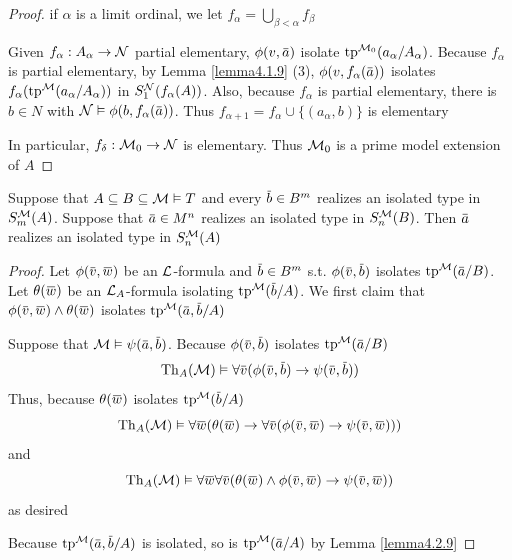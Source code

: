 \documentclass[11pt]{article}
\begin{document}
\begin{proof}
if \(\alpha\) is a limit ordinal, we let \(f_\alpha=\bigcup_{\beta<\alpha}f_\beta\)

Given \(f_\alpha:A_\alpha\to\mathcal{N}\) partial elementary, \(\phi(v,\bara)\) isolate \(\operatorname{tp}^{\mathcal{M}_0}(a_\alpha/A_\alpha)\).
Because \(f_\alpha\) is partial elementary, by Lemma \ref{lemma4.1.9} (3), \(\phi(v,f_\alpha(\bara))\)
isolates \(f_\alpha(\operatorname{tp}^{\mathcal{M}}(a_\alpha/A_\alpha))\) in \(S_1^{\mathcal{N}}(f_\alpha(A))\). Also, because \(f_\alpha\) is partial
elementary, there is \(b\in N\) with \(\caln\vDash\phi(b,f_\alpha(\bara))\). Thus \(f_{\alpha+1}=f_\alpha\cup\{(a_\alpha,b)\}\) is
elementary

In particular, \(f_\delta:\mathcal{M}_0\to\mathcal{N}\) is elementary. Thus \(\mathcal{M}_0\) is a prime model extension of \(A\)
\end{proof}


\begin{lemma}[]
Suppose that \(A\subseteq B\subseteq \mathcal{M}\vDash T\) and every \(\barb\in B^m\) realizes an isolated type in \(S_m^{\mathcal{M}}(A)\).
Suppose that \(\bara\in M^n\) realizes an isolated type in \(S_n^{\mathcal{M}}(B)\). Then \(\bara\) realizes
an isolated type in \(S_n^{\mathcal{M}}(A)\)
\end{lemma}

\begin{proof}
Let \(\phi(\barv,\barw)\) be an \(\mathcal{L}\)-formula and \(\barb\in B^m\) s.t. \(\phi(\barv,\barb)\)
isolates \(\tp^{\calm}(\bara/B)\). Let \(\theta(\barw)\) be an \(\mathcal{L}_A\)-formula
isolating \(\tp^{\calm}(\barb/A)\). We first claim that \(\phi(\barv,\barw)\wedge\theta(\barw)\)
isolates \(\tp^{\calm}(\bara,\barb/A)\)

Suppose that \(\calm\vDash\psi(\bara,\barb)\). Because \(\phi(\barv,\barb)\) isolates \(\tp^{\calm}(\bara/B)\)
\begin{equation*}
\Th_A(\calm)\vDash\forall\barv(\phi(\barv,\barb)\to\psi(\barv,\barb))
\end{equation*}
Thus, because \(\theta(\barw)\) isolates \(\tp^{\calm}(\barb/A)\)
\begin{equation*}
\Th_A(\calm)\vDash\forall\barw(\theta(\barw)\to\forall\barv(\phi(\barv,\barw)\to\psi(\barv,\barw)))
\end{equation*}
and
\begin{equation*}
\Th_A(\calm)\vDash\forall\barw\forall\barv(\theta(\barw)\wedge\phi(\barv,\barw)\to\psi(\barv,\barw))
\end{equation*}
as desired

Because \(\tp^{\calm}(\bara,\barb/A)\) is isolated, so is \(\tp^{\calm}(\bara/A)\) by Lemma
\ref{lemma4.2.9}
\end{proof}
\end{document}
